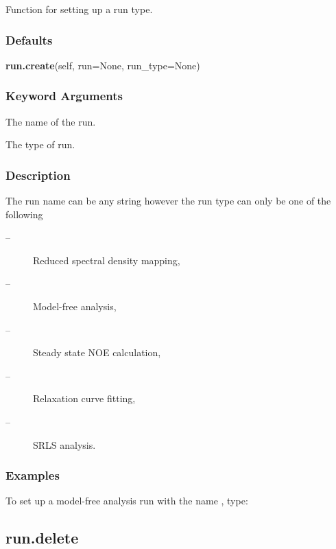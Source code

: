 Function for setting up a run type.



\subsubsection{Defaults}

\textsf{\textbf{run.create}(self, run=None, run\_type=None)}


\subsubsection{Keyword Arguments}

  The name of the run. 

  The type of run. 




\subsubsection{Description}

The run name can be any string however the run type can only be one of the following


\begin{description}
\item[ --]  Reduced spectral density mapping, 
\item[ --]  Model-free analysis, 
\item[ --]  Steady state NOE calculation, 
\item[ --]  Relaxation curve fitting, 
\item[ --]  SRLS analysis. 
\end{description}



\subsubsection{Examples}

To set up a model-free analysis run with the name , type:





\newpage

\subsection{run.delete}


